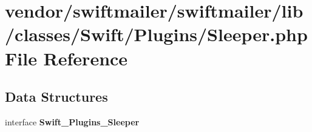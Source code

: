 \section{vendor/swiftmailer/swiftmailer/lib/classes/\+Swift/\+Plugins/\+Sleeper.php File Reference}
\label{_sleeper_8php}
\subsection*{Data Structures}
\begin{DoxyCompactItemize}
\item 
interface {\bf Swift\+\_\+\+Plugins\+\_\+\+Sleeper}
\end{DoxyCompactItemize}
